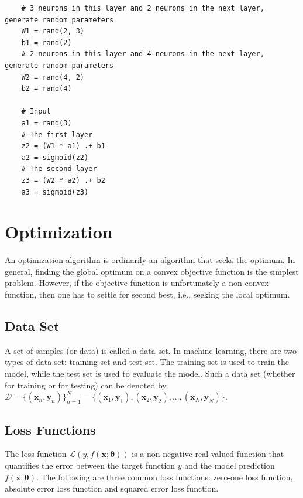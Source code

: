 \documentclass[
	parskip, 			   %
	twoside, 			   %
	DIV=14, 			   %
	BCOR=15.0mm, 		   %
	headsepline, 		   %
	open=right, 		   %
	captions=tableheading, %
	bibliography=totoc,    %
	numbers=noenddot       %
]{scrreprt}
\begin{document}
\begin{verbatim}
    # 3 neurons in this layer and 2 neurons in the next layer, generate random parameters
    W1 = rand(2, 3)
    b1 = rand(2)
    # 2 neurons in this layer and 4 neurons in the next layer, generate random parameters
    W2 = rand(4, 2)
    b2 = rand(4)
    
    # Input
    a1 = rand(3)
    # The first layer
    z2 = (W1 * a1) .+ b1
    a2 = sigmoid(z2)
    # The second layer
    z3 = (W2 * a2) .+ b2
    a3 = sigmoid(z3)

\end{verbatim}

\section{Optimization}
An optimization algorithm is ordinarily an algorithm that seeks the optimum. In general, finding the global optimum on a convex objective function is the simplest problem. However, if the objective function is unfortunately a non-convex function, then one has to settle for second best, i.e., seeking the local optimum.

\subsection{Data Set}
A set of samples (or data) is called a data set. In machine learning, there are two types of data set: training set and test set. The training set is used to train the model, while the test set is used to evaluate the model. Such a data set (whether for training or for testing) can be denoted by $\mathcal{D}=\{ (\mathbf{x}_{n}, \mathbf{y}_{n}) \}_{n=1}^{N} = \{ (\mathbf{x}_{1}, \mathbf{y}_{1}),  (\mathbf{x}_{2}, \mathbf{y}_{2}), ..., (\mathbf{x}_{N}, \mathbf{y}_{N}) \}$.

\subsection{Loss Functions}
The loss function $\mathcal{L}\left( y,f(\mathbf{x};\mathbf{\theta}) \right)$ is a non-negative real-valued function that quantifies the error between the target function $y$ and the model prediction $f(\mathbf{x};\mathbf{\theta})$. The following are three common loss functions: zero-one loss function, absolute error loss function and squared error loss function.
\end{document}
